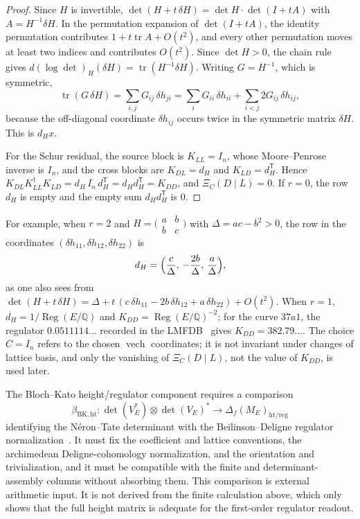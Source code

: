 \documentclass[11pt]{article}
\theoremstyle{definition}
\newcommand{\Q}{\mathbb{Q}}
\newcommand{\Reg}{\operatorname{Reg}}
\newcommand{\tr}{\operatorname{tr}}
\newcommand{\XiC}{\Xi_C(D\mid L)}        \newcommand{\KDD}{K_{DD}}
\newcommand{\KDL}{K_{DL}}
\newcommand{\KLL}{K_{LL}}
\newcommand{\Kdagger}{K_{LL}^{\dagger}}  \newcommand{\vsrc}{\mathrm{vsrc}}        \newcommand{\Jone}{J_1}
\begin{document}
\begin{proof}
Since $H$ is invertible, $\det(H+t\,\delta H)=\det H\cdot\det(I+tA)$ with
$A=H^{-1}\delta H$.  In the permutation expansion of $\det(I+tA)$, the
identity permutation contributes $1+t\tr A+O(t^2)$, and every other
permutation moves at least two indices and contributes $O(t^2)$.  Since
$\det H>0$, the chain rule gives $d(\log\det)_H(\delta H)=\tr(H^{-1}\delta
H)$.  Writing $G=H^{-1}$, which is symmetric,
\[
  \tr(G\,\delta H)=\sum_{i,j}G_{ij}\,\delta h_{ji}
  =\sum_i G_{ii}\,\delta h_{ii}+\sum_{i<j}2G_{ij}\,\delta h_{ij},
\]
because the off-diagonal coordinate $\delta h_{ij}$ occurs twice in the
symmetric matrix $\delta H$.  This is $d_Hx$.

For the Schur residual, the source block is $\KLL=I_n$, whose
Moore--Penrose inverse is $I_n$, and the cross blocks are $\KDL=d_H$ and
$K_{LD}=d_H^{\mathsf T}$.  Hence
$\KDL\Kdagger K_{LD}=d_H\,I_n\,d_H^{\mathsf T}=d_Hd_H^{\mathsf T}=\KDD$,
and $\XiC=0$.  If $r=0$, the row $d_H$ is empty and the empty sum
$d_Hd_H^{\mathsf T}$ is $0$.
\end{proof}

For example, when $r=2$ and $H=\bigl(\begin{smallmatrix}a&b\\
b&c\end{smallmatrix}\bigr)$ with $\Delta=ac-b^2>0$, the row in the
coordinates $(\delta h_{11},\delta h_{12},\delta h_{22})$ is
\[
  d_H=\Bigl(\frac{c}{\Delta},\,-\frac{2b}{\Delta},\,\frac{a}{\Delta}\Bigr),
\]
as one also sees from $\det(H+t\,\delta H)=\Delta+t\,(c\,\delta h_{11}-2b\,
\delta h_{12}+a\,\delta h_{22})+O(t^2)$.  When $r=1$, $d_H=1/\Reg(E/\Q)$
and $\KDD=\Reg(E/\Q)^{-2}$; for the curve $37a1$, the regulator
$0.0511114\ldots$ recorded in the LMFDB~\citep{LMFDB} gives
$\KDD=382.79\ldots$.  The choice $C=I_n$ refers to the chosen
$\operatorname{vech}$ coordinates; it is not invariant under changes of
lattice basis, and only the vanishing of $\XiC$, not the value of $\KDD$,
is used later.

\begin{obligation}\label{obl:apparatus:rho-ht-reg-transport}
The Bloch--Kato height/regulator component requires a comparison
\[
  \beta_{\mathrm{BK,ht}}:
  \det(V_E^*)\otimes\det(V_E)^*
  \longrightarrow
  \Delta_f(M_E)_{\mathrm{ht/reg}}
\]
identifying the N\'eron--Tate determinant with the Beilinson--Deligne
regulator normalization~\citep{Beilinson1985}.  It must fix
the coefficient and lattice conventions, the archimedean
Deligne-cohomology normalization, and the orientation and
trivialization, and it must be compatible with the finite and
determinant-assembly columns without absorbing them.  This comparison is
external arithmetic input.  It is not derived from the finite calculation
above, which only shows that the full height matrix is adequate for the
first-order regulator readout.
\end{obligation}
\end{document}
